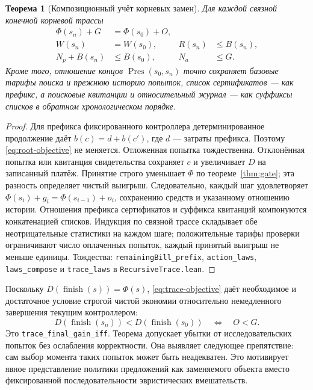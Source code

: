 \documentclass[10pt,a4paper]{article}
\newtheorem{theorem}{Теорема}[section]
\newcommand{\Pres}{\operatorname{Pres}}
\newcommand{\finish}{\operatorname{finish}}
\newcommand{\rc}[1]{\allowbreak\texttt{#1}\allowbreak}
\begin{document}
\begin{theorem}[Композиционный учёт корневых замен]\label{thm:root-trace}
Для каждой связной конечной корневой трассы
\begin{align}
 \Phi(s_n)+G&=\Phi(s_0)+O,\label{eq:trace-objective}\\
 W(s_n)&=W(s_0),& R(s_n)&\le B(s_n),\label{eq:trace-funds}\\
 N_p+B(s_n)&\le B(s_0),& N_a&\le G.
\end{align}
Кроме того, отношение концов $\Pres(s_0,s_n)$ точно сохраняет базовые тарифы поиска и прежнюю историю попыток, список сертификатов --- как префикс, а поисковые квитанции и относительный журнал --- как суффиксы списков в обратном хронологическом порядке.
\end{theorem}
\begin{proof}
Для префикса фиксированного контроллера детерминированное продолжение даёт $b(c)=d+b(c')$, где $d$ --- затраты префикса. Поэтому \eqref{eq:root-objective} не меняется. Отложенная попытка тождественна. Отклонённая попытка или квитанция свидетельства сохраняет $c$ и увеличивает $D$ на записанный платёж. Принятие строго уменьшает $\Phi$ по теореме~\ref{thm:gate}; эта разность определяет чистый выигрыш. Следовательно, каждый шаг удовлетворяет $\Phi(s_i)+g_i=\Phi(s_{i-1})+o_i$, сохранению средств и указанному отношению истории. Отношения префикса сертификатов и суффикса квитанций компонуются конкатенацией списков. Индукция по связной трассе складывает обе неотрицательные статистики на каждом шаге; положительные тарифы проверки ограничивают число оплаченных попыток, каждый принятый выигрыш не меньше единицы. Тождества: \rc{remainingBill\_prefix}, \rc{action\_laws}, \rc{laws\_compose} и \rc{trace\_laws} в \rc{RecursiveTrace.lean}.
\end{proof}
Поскольку $D(\finish(s))=\Phi(s)$, \eqref{eq:trace-objective} даёт необходимое и достаточное условие строгой чистой экономии относительно немедленного завершения текущим контроллером:
\begin{equation}\label{eq:net-gain}
 D(\finish(s_n))<D(\finish(s_0))\quad\Longleftrightarrow\quad O<G.
\end{equation}
Это \rc{trace\_final\_gain\_iff}. Теорема допускает убытки от исследовательских попыток без ослабления корректности. Она выявляет следующее препятствие: сам выбор момента таких попыток может быть неадекватен. Это мотивирует явное представление политики предложений как заменяемого объекта вместо фиксированной последовательности эвристических вмешательств.
\end{document}
